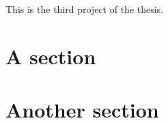 This is the third project of the thesis.

\lipsum[1]

\section{A section}
\lipsum[2]

\section{Another section}
\lipsum[3]